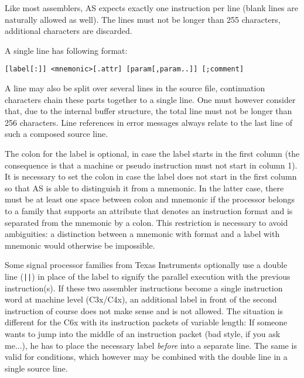 \documentclass[12pt,twoside]{report}
\newcommand{\asname}{{AS}}
\begin{document}
Like most assemblers, \asname{} expects exactly one instruction per line
(blank lines are naturally allowed as well).  The lines must not be
longer than 255 characters, additional characters are discarded.

A single line has following format:
\begin{verbatim}
[label[:]] <mnemonic>[.attr] [param[,param..]] [;comment]
\end{verbatim}
A line may also be split over several lines in the source file,
continuation characters chain these parts together to a single line.  One
must however consider that, due to the internal buffer structure, the
total line must not be longer than 256 characters.  Line references in
error messages always relate to the last line of such a composed source
line.
\par
The colon for the label is optional, in case the label starts in the
first column (the consequence is that a machine or pseudo
instruction must not start in column 1).  It is necessary to set the
colon in case the label does not start in the first column so that \asname{}
is able to distinguish it from a mnemonic.  In the latter case, there
must be at least one space between colon and mnemonic if the processor
belongs to a family that supports an attribute that denotes an
instruction format and is separated from the mnemonic by a colon.  This
restriction is necessary to avoid ambiguities: a distinction between a
mnemonic with format and a label with mnemonic would otherwise be
impossible.

Some signal processor families from Texas Instruments optionally use
a double line (\verb!||!) in place of the label to signify the
parallel execution with the previous instruction(s).  If these two
assembler instructions become a single instruction word at machine
level (C3x/C4x), an additional label in front of the second
instruction of course does not make sense and is not allowed.  The
situation is different for the C6x with its instruction packets of
variable length: If someone wants to jump into the middle of an
instruction packet (bad style, if you ask me...), he has to place the
necessary label {\em before} into a separate line.  The same is valid
for conditions, which however may be combined with the double line in
a single source line.
\end{document}
